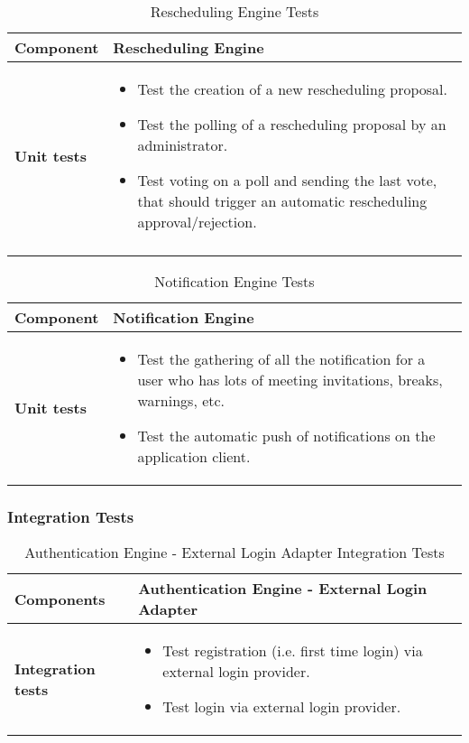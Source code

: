 \begin{table}[H]	
	\centering
	\def\arraystretch{1.5}
	\begin{tabular}{|m{4cm}|m{12cm}|}
		\hline
		\textbf{Component} & Rescheduling Engine \\ \hline
		\textbf{Unit tests} & 
			\begin{itemize}
			\item Test the creation of a new rescheduling proposal.
			\item Test the polling of a rescheduling proposal by an administrator.
			\item Test voting on a poll and sending the last vote, that should trigger an automatic rescheduling approval/rejection.
			\end{itemize} \\ \hline
			\end{itemize} \\ \hline
	\end{tabular}
	\caption{Rescheduling Engine Tests}
\end{table}

\begin{table}[H]	
	\centering
	\def\arraystretch{1.5}
	\begin{tabular}{|m{4cm}|m{12cm}|}
		\hline
		\textbf{Component} & Notification Engine \\ \hline
		\textbf{Unit tests} & 
			\begin{itemize}
			\item Test the gathering of all the notification for a user who has lots of meeting invitations, breaks, warnings, etc.
			\item Test the automatic push of notifications on the application client.
			\end{itemize} \\ \hline
	\end{tabular}
	\caption{Notification Engine Tests}
\end{table}

\subsubsection{Integration Tests}

\begin{table}[H]	
	\centering
	\def\arraystretch{1.5}
	\begin{tabular}{|m{4cm}|m{12cm}|}
		\hline
		\textbf{Components} & Authentication Engine - External Login Adapter \\ \hline
		\textbf{Integration tests} &
			\begin{itemize} 
			\item Test registration (i.e. first time login) via external login provider.
			\item Test login via external login provider. 
			\end{itemize} \\ \hline
	\end{tabular}
	\caption{Authentication Engine - External Login Adapter Integration Tests}
\end{table}

